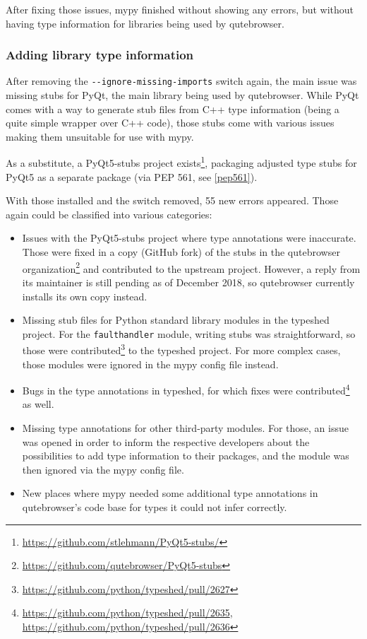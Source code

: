 \documentclass[a4paper,parskip=full,DIV=14,BCOR=15mm]{scrreprt}
\begin{document}
After fixing those issues, mypy finished without showing any errors, but without
having type information for libraries being used by qutebrowser.

\subsubsection{Adding library type information}

After removing the \verb|--ignore-missing-imports| switch again, the main issue
was missing stubs for PyQt, the main library being used by qutebrowser. While
PyQt comes with a way to generate stub files from C++ type information (being a
quite simple wrapper over C++ code), those stubs come with various issues making
them unsuitable for use with mypy.

As a substitute, a PyQt5-stubs project
exists\footnote{\url{https://github.com/stlehmann/PyQt5-stubs/}}, packaging
adjusted type stubs for PyQt5 as a separate package (via PEP 561, see
\ref{pep561}).

With those installed and the switch removed, 55 new errors appeared. Those again
could be classified into various categories:

\begin{itemize}
  \item Issues with the PyQt5-stubs project where type annotations were
    inaccurate. Those were fixed in a copy (GitHub fork) of the stubs in the
    qutebrowser
    organization\footnote{\url{https://github.com/qutebrowser/PyQt5-stubs}} and
    contributed to the upstream project. However, a reply from its maintainer is
    still pending as of December 2018, so qutebrowser currently installs its own
    copy instead.
  \item Missing stub files for Python standard library modules in the typeshed
    project. For the \verb|faulthandler| module, writing stubs was
    straightforward, so those were
    contributed\footnote{\url{https://github.com/python/typeshed/pull/2627}} to
    the typeshed project. For more complex cases, those modules were ignored in
    the mypy config file instead.
  \item Bugs in the type annotations in typeshed, for which fixes were
    contributed\footnote{\url{https://github.com/python/typeshed/pull/2635}, \\
      \url{https://github.com/python/typeshed/pull/2636}} as well.
  \item Missing type annotations for other third-party modules. For those, an
    issue was opened in order to inform the respective developers about the
    possibilities to add type information to their packages, and the module was
    then ignored via the mypy config file.
  \item New places where mypy needed some additional type annotations in
    qutebrowser's code base for types it could not infer correctly.
\end{itemize}
\end{document}
